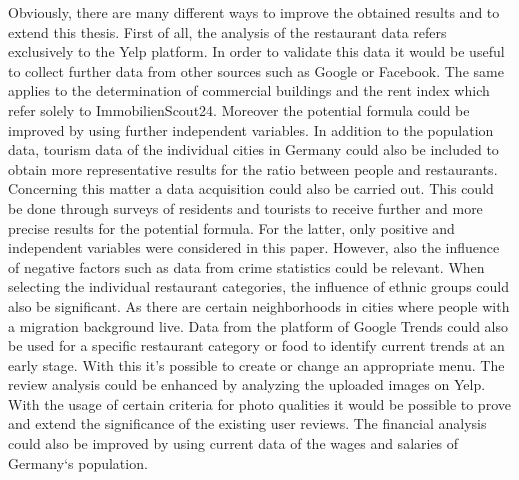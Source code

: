 Obviously, there are many different ways to improve the obtained results and to extend this thesis. First of all, the analysis of the restaurant data refers exclusively to the Yelp platform. In order to validate this data it would be useful to collect further data from other sources such as Google or Facebook. The same applies to the determination of commercial buildings and the rent index which refer solely to ImmobilienScout24. \newline
Moreover the potential formula could be improved by using further independent variables. In addition to the population data, tourism data of the individual cities in Germany could also be included to obtain more representative results for the ratio between people and restaurants. Concerning this matter a data acquisition could also be carried out. This could be done through surveys of residents and tourists to receive further and more precise results for the potential formula. For the latter, only positive and independent variables were considered in this paper. However, also the influence of negative factors such as data from crime statistics could be relevant. \newline
When selecting the individual restaurant categories, the influence of ethnic groups could also be significant. As there are certain neighborhoods in cities where people with a migration background live. Data from the platform of Google Trends could also be used for a specific restaurant category or food to identify current trends at an early stage. With this it's possible to create or change an appropriate menu. \newline
The review analysis could be enhanced by analyzing the uploaded images on Yelp. With the usage of certain criteria for photo qualities it would be possible to prove and extend the significance of the existing user reviews. The financial analysis could also be improved by using current data of the wages and salaries of Germany‘s population.